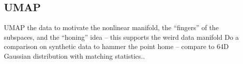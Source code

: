 \documentclass[../main.tex]{subfiles}
\begin{document}










\subsection{UMAP}

UMAP the data to motivate the nonlinear manifold, the “fingers” of the subspaces, and the “honing” idea – this supports the weird data manifold
Do a comparison on synthetic data to hammer the point home – compare to 64D Gaussian distribution with matching statistics..

\end{document}
